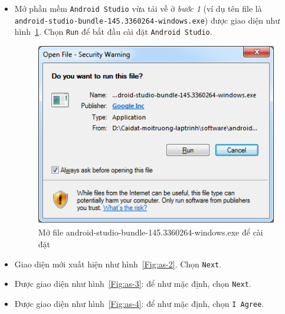 \documentclass[13pt,a4paper]{extreport}
\begin{document}
\begin{itemize}
\begin{itemize}
				\item Mở phần mềm \verb|Android Studio| vừa tải về ở \textit{bước 1} (ví dụ tên file là \verb|android-studio-bundle-145.3360264-windows.exe|) được giao diện như hình~\ref{Fig:as-1}. Chọn \verb|Run| để bắt đầu cài đặt \verb|Android Studio|.
					\begin{figure}[!h]
						\begin{center}
							\includegraphics[scale=.65]{as-1.png}
						\end{center}
						\caption{Mở file android-studio-bundle-145.3360264-windows.exe để cài đặt}
						\label{Fig:as-1}
						\vspace{-1cm}
					\end{figure}

				\newpage
				\item Giao diện mới xuất hiện như hình~\ref{Fig:as-2}. Chọn \verb|Next|.
				
				\item Được giao diện như hình~\ref{Fig:as-3}: để như mặc định, chọn \verb|Next|.
				
				\item Được giao diện như hình~\ref{Fig:as-4}: để như mặc định, chọn \verb|I Agree|.	
					

\end{itemize}
\end{itemize}
\end{document}

